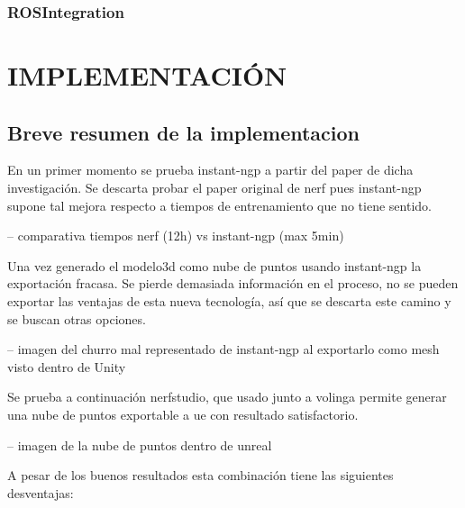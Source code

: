 \documentclass[a4paper, 12pt, spanish, twoside]{article}
\begin{document}
\subsubsection{ROSIntegration} \label{sec:herramientas:entornoros:rosintegration}


\clearpage





\newpage
\section{IMPLEMENTACIÓN} \label{sec:implementacion}

\subsection{Breve resumen de la implementacion} \label{sec:implementacion:resumen}

En un primer momento se prueba \gls{instant-ngp} a partir del paper de dicha investigación. Se descarta probar el paper original de \acrshort{nerf} pues \gls{instant-ngp} supone tal mejora respecto a tiempos de entrenamiento que no tiene sentido. 

-- comparativa tiempos nerf (12h) vs instant-ngp (max 5min) 

Una vez generado el \gls{modelo3d} como nube de puntos usando \gls{instant-ngp} la exportación fracasa. Se pierde demasiada información en el proceso, no se pueden exportar las ventajas de esta nueva tecnología, así que se descarta este camino y se buscan otras opciones. 

-- imagen del churro mal representado de instant-ngp al exportarlo como mesh visto dentro de Unity 

Se prueba a continuación \gls{nerfstudio}, que usado junto a \gls{volinga} permite generar una nube de puntos exportable a \acrfull{ue} con resultado satisfactorio.  

-- imagen de la nube de puntos dentro de unreal 

A pesar de los buenos resultados esta combinación tiene las siguientes desventajas: 
\end{document}
